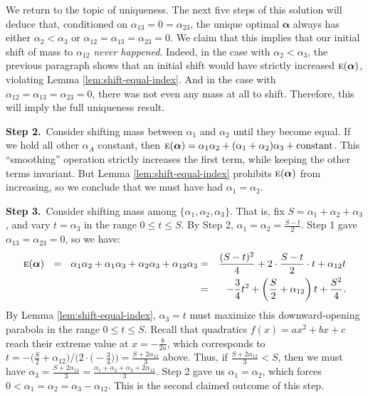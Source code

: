 \documentclass[11pt]{article}
\newcommand{\ec}{\text{\sc e}}
\newcommand{\blpha}{{\boldsymbol\alpha}}
\begin{document}
We return to the topic of uniqueness.  The next five steps of this
solution will deduce that, conditioned on $\alpha_{13} = 0 =
\alpha_{23}$, the unique optimal $\blpha$ always has either $\alpha_2
< \alpha_3$ or $\alpha_{12} = \alpha_{13} = \alpha_{23} = 0$.  We
claim that this implies that our initial shift of mass to
$\alpha_{12}$ \emph{never happened}.  Indeed, in the case with
$\alpha_2 < \alpha_3$, the previous paragraph shows that an initial
shift would have strictly increased $\ec(\blpha)$, violating Lemma
\ref{lem:shift-equal-index}.  And in the case with $\alpha_{12} =
\alpha_{13} = \alpha_{23} = 0$, there was not even any mass at all to
shift.  Therefore, this will imply the full uniqueness result.

\vspace{3mm}


\noindent \textbf{Step 2.}\, Consider shifting mass between $\alpha_1$
and $\alpha_2$ until they become equal.  If we hold all other
$\alpha_A$ constant, then $\ec(\blpha) = \alpha_1 \alpha_2 + (\alpha_1
+ \alpha_2) \alpha_3 + \text{constant}$.  This ``smoothing'' operation
strictly increases the first term, while keeping the other terms
invariant.  But Lemma \ref{lem:shift-equal-index} prohibits
$\ec(\blpha)$ from increasing, so we conclude that we must have had
$\alpha_1 = \alpha_2$.

\vspace{3mm}


\noindent \textbf{Step 3.}\, Consider shifting mass among $\{\alpha_1,
\alpha_2, \alpha_3\}$.  That is, fix $S = \alpha_1 + \alpha_2 +
\alpha_3$, and vary $t = \alpha_3$ in the range $0 \leq t \leq S$.  By
Step 2, $\alpha_1 = \alpha_2 = \frac{S-t}{2}$.  Step 1 gave $\alpha_{13} =
\alpha_{23} = 0$, so we have:
\begin{eqnarray*}
  \ec(\blpha) 
  \ \ = \ \ \alpha_1 \alpha_2 + \alpha_1 \alpha_3 + \alpha_2 \alpha_3 + \alpha_{12} \alpha_3 
  &=& \frac{(S-t)^2}{4} + 2 \cdot \frac{S-t}{2} \cdot t + \alpha_{12} t \\
  &=& -\frac{3}{4} t^2 + \left(\frac{S}{2} + \alpha_{12}\right) t + \frac{S^2}{4}.
\end{eqnarray*}
By Lemma \ref{lem:shift-equal-index}, $\alpha_3 = t$ must maximize
this downward-opening parabola in the range $0 \leq t \leq S$.  Recall
that quadratics $f(x) = ax^2 + bx + c$ reach their extreme value at $x
= -\frac{b}{2a}$, which corresponds to $t = -\big(\frac{S}{2} +
\alpha_{12}\big)/\big(2 \cdot \big(-\frac{3}{4}\big)\big) = \frac{S +
  2\alpha_{12}}{3}$ above.  Thus, if $\frac{S + 2\alpha_{12}}{3} < S$,
then we must have $\alpha_3 = \frac{S + 2\alpha_{12}}{3} =
\frac{\alpha_1 + \alpha_2 + \alpha_3 + 2\alpha_{12}}{3}$.  Step 2 gave
us $\alpha_1 = \alpha_2$, which forces $0 < \alpha_1 = \alpha_2 =
\alpha_3 - \alpha_{12}$.  This is the second claimed outcome of this
step.
\end{document}

